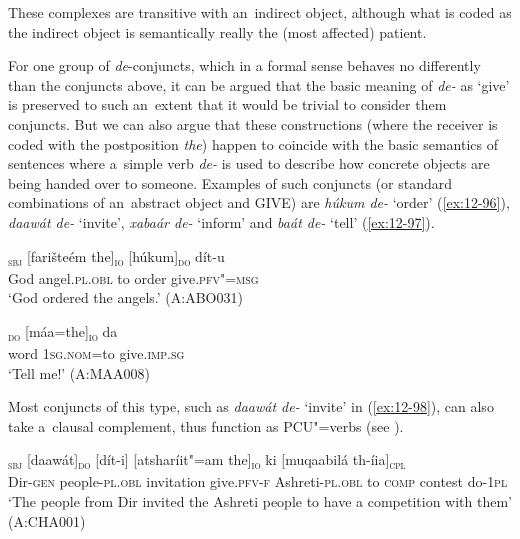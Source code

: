These complexes are transitive with an~indirect object, although what is coded as the indirect object is semantically really the (most affected) patient. 


 For one group of \textit{de}-conjuncts, which in a formal sense behaves no differently than the conjuncts above, it can be argued that the basic meaning of \textit{de-} as `give' is preserved to such an~extent that it would be trivial to consider them conjuncts. But we can also argue that these constructions (where the receiver is coded with the postposition \textit{the}) happen to coincide with the basic semantics of sentences where a~simple verb \textit{de-} is used to describe how concrete objects are being handed over to someone. Examples of such conjuncts (or standard combinations of an~abstract object and GIVE) are \textit{húkum de-} `order' (\ref{ex:12-96}), \textit{daawát de-} `invite', \textit{xabaár de-} `inform' and \textit{baát de-} `tell' (\ref{ex:12-97}).

\begin{exe}
\ex
\label{ex:12-96}
\gll [alaahtaalaá]\textsubscript{\textsc{sbj}} [farišteém the]\textsubscript{\textsc{io}} [húkum]\textsubscript{\textsc{do}} dít-u \\
God angel.\textsc{pl.obl} to order  give.\textsc{pfv"=msg} \\
\glt `God ordered the angels.' (A:ABO031)
\end{exe}
\begin{exe}
\ex
\label{ex:12-97}
\gll [baát]\textsubscript{\textsc{do}} [máa=the]\textsubscript{\textsc{io}} da  \\
word \textsc{1sg.nom=}to give.\textsc{imp.sg} \\
\glt `Tell me!' (A:MAA008)
\end{exe}

Most conjuncts of this type, such as \textit{daawát de-} `invite' in (\ref{ex:12-98}), can also take a~clausal complement, thus function as PCU"=verbs (see ).

\begin{exe}
\ex
\label{ex:12-98}
\gll [deeúl-ii xálak"=am]\textsubscript{\textsc{sbj}} [daawát]\textsubscript{\textsc{do}} [dít-i] [atsharíit"=am the]\textsubscript{\textsc{io}} ki [muqaabilá th-íia]\textsubscript{\textsc{cpl}}  \\
Dir-\textsc{gen} people-\textsc{pl.obl} invitation give.\textsc{pfv-f}  Ashreti-\textsc{pl.obl} to \textsc{comp} contest do-\textsc{1pl} \\
\glt `The people from Dir invited the Ashreti people to have a competition with them' (A:CHA001)
\end{exe}

